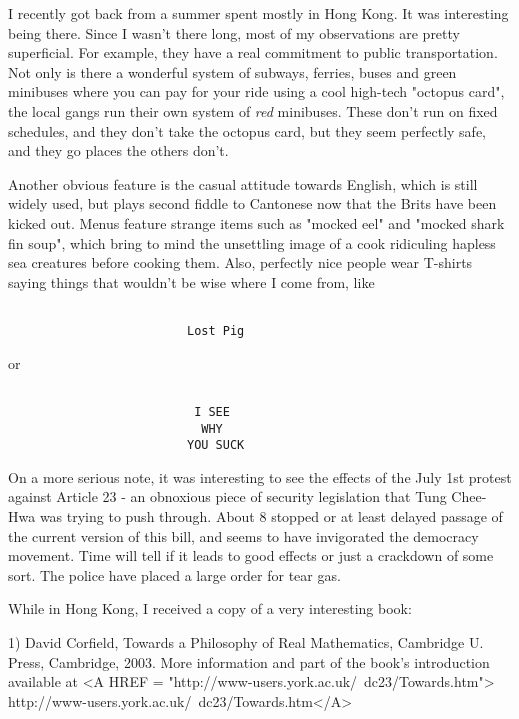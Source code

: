 


I recently got back from a summer spent mostly in Hong Kong.
It was interesting being there.  Since I wasn't there long,
most of my observations are pretty superficial.  For example, 
they have a real commitment to public transportation.  Not 
only is there a wonderful system of subways, ferries, buses 
and green minibuses where you can pay for your ride using a 
cool high-tech "octopus card", the local gangs run their own 
system of \emph{red} minibuses.  These don't run on fixed schedules, 
and they don't take the octopus card, but they seem perfectly
safe, and they go places the others don't.  

Another obvious feature is the casual attitude towards English, 
which is still widely used, but plays second fiddle to Cantonese 
now that the Brits have been kicked out.  Menus feature strange 
items such as "mocked eel" and "mocked shark fin soup", which 
bring to mind the unsettling image of a cook ridiculing hapless
sea creatures before cooking them.  Also, perfectly nice people 
wear T-shirts saying things that wouldn't be wise where I come 
from, like


\begin{verbatim}

                         Lost Pig
\end{verbatim}
    
or 


\begin{verbatim}

                          I SEE 
                           WHY 
                         YOU SUCK
\end{verbatim}
    
On a more serious note, it was interesting to see the effects 
of the July 1st protest against Article 23 - an obnoxious piece of
security legislation that Tung Chee-Hwa was trying to push through.   
About 8%
stopped or at least delayed passage of the current version of this 
bill, and seems to have invigorated the democracy movement.  Time 
will tell if it leads to good effects or just a crackdown of some 
sort.  The police have placed a large order for tear gas.   

While in Hong Kong, I received a copy of a very interesting book:

1) David Corfield, Towards a Philosophy of Real Mathematics,
Cambridge U. Press, Cambridge, 2003.  More information
and part of the book's introduction available at 
<A HREF = "http://www-users.york.ac.uk/~dc23/Towards.htm">
http://www-users.york.ac.uk/~dc23/Towards.htm</A>

